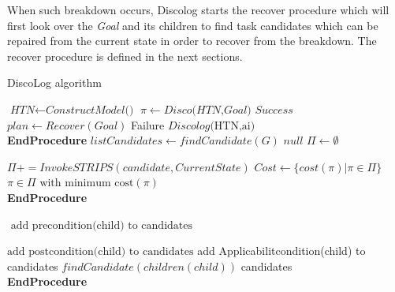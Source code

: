 When such breakdown occurs, Discolog starts the recover procedure which will first look over the \textit{Goal} and its children to find task candidates which can be repaired from the current state in order to recover from the breakdown. The recover procedure is defined in the next sections.  
\begin{algorithm}
	\caption{DiscoLog algorithm }\label{euclid}
	\begin{algorithmic}[]
		\State $\textit{HTN} \gets\textit{ConstructModel()} $
		\State $\pi \gets Disco \textit{(HTN,Goal)}$
		\State \Return $\textit{Success} $
		\Else 
		\State$ plan \gets Recover(Goal)$
		\State \Return Failure
		\Else 
		\State  $\textit{Discolog} \text{(HTN,ai)}$
		\EndFor
		\EndIf
		\EndIf
		\\
		\EndProcedure \textbf{EndProcedure}
		\State 
		\State $\textit{listCandidates}\gets\textit{findCandidate}{(G)} $
		\State \Return $\textit{null} $
		\Else 
		\State $\Pi \gets \emptyset$
		
		\State $\Pi += InvokeSTRIPS(candidate,CurrentState)$
		\State  $Cost \gets \{ cost(\pi) | \pi \in  \Pi \} $
		\EndFor
		\EndIf
		\State \Return $\pi \in \Pi \text{ with minimum cost}(\pi)$
		\\
		\EndProcedure \textbf{EndProcedure}
		
		\State 
		
		\State $  \text{ add precondition(child) to candidates}$
		
		\State $\text{add postcondition(child) to candidates}$
		\EndIf
		\State add Applicabilitcondition(child) to candidates
		\EndIf
		\State $\textit{findCandidate} (children(child))$
		\EndFor
		\State \Return candidates
		\\
		\EndProcedure \textbf{EndProcedure}
		
	\end{algorithmic}
\end{algorithm}
